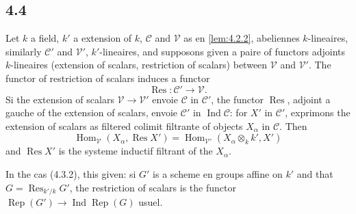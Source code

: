 \documentclass[12pt,a4paper]{article}
\theoremstyle{plain}
\theoremstyle{definition}
\theoremstyle{remark}
\DeclareMathOperator{\Hom}{Hom}
\DeclareMathOperator{\Ind}{Ind}
\DeclareMathOperator{\Res}{Res}
\providecommand{\Hom}{\operatorname{Hom}}
\providecommand{\Rep}{\operatorname{Rep}}
\begin{document}
\subsection*{4.4}

Let $k$ a field, $k'$ a extension of $k$, $\mathcal{C}$ and $\mathcal{V}$ as en
\ref{lem:4.2.2}, abeliennes $k$-lineaires, similarly $\mathcal{C}'$ and $\mathcal{V}'$,
$k'$-lineaires, and supposons given a paire of functors adjoints $k$-lineaires
(extension of scalars, restriction of scalars) between $\mathcal{V}$ and $\mathcal{V}'$.
The functor of restriction of scalars induces a functor
\[
\Res: \mathcal{C}' \longrightarrow \mathcal{V}.
\]
Si the extension of scalars $\mathcal{V} \to \mathcal{V}'$ envoie $\mathcal{C}$ in
$\mathcal{C}'$, the functor $\Res$, adjoint a gauche of the extension of scalars,
envoie $\mathcal{C}'$ in $\Ind\mathcal{C}$: for $X'$ in $\mathcal{C}'$, exprimons
the extension of scalars as filtered colimit filtrante of objects $X_\alpha$ in
$\mathcal{C}$. Then
\[
\Hom_{\mathcal{V}}(X_\alpha, \Res X') = \Hom_{\mathcal{V}'}(X_\alpha \otimes_k k', X')
\]
and $\Res X'$ is the systeme inductif filtrant of the $X_\alpha$.

In the cas (4.3.2), this given: si $G'$ is a scheme en groups affine on $k'$ and
that $G = \Res_{k'/k} G'$, the restriction of scalars is the functor
$\Rep(G') \to \Ind\Rep(G)$ usuel.
\end{document}
